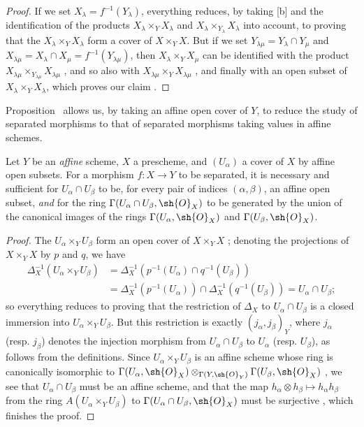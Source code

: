 \begin{proof}
If we set $X_\lambda=f^{-1}(Y_\lambda)$, everything reduces, by taking [b] and the identification of the products $X_\lambda\times_Y X_\lambda$ and $X_\lambda\times_{Y_\lambda}X_\lambda$  into account, to proving that the $X_\lambda\times_Y X_\lambda$ form a cover of $X\times_Y X$.
But if we set $Y_{\lambda\mu}=Y_\lambda\cap Y_\mu$ and $X_{\lambda\mu}=X_\lambda\cap X_\mu=f^{-1}(Y_{\lambda\mu})$, then $X_\lambda\times_Y X_\mu$ can be identified with the product $X_{\lambda\mu}\times_{Y_{\lambda\mu}}X_{\lambda\mu}$ , and so also with $X_{\lambda\mu}\times_Y X_{\lambda\mu}$ , and finally with an open subset of $X_\lambda\times_Y X_\lambda$, which proves our claim .
\end{proof}

Proposition~ allows us, by taking an affine open cover of $Y$, to reduce the study of separated morphisms to that of separated morphisms taking values in affine schemes.

\begin{proposition}[5.5.6]
\label{I.5.5.6}
Let $Y$ be an \emph{affine} scheme, $X$ a prescheme, and $(U_\alpha)$ a cover of $X$ by affine open subsets.
For a morphism $f:X\to Y$ to be separated, it is necessary and sufficient for $U_\alpha\cap U_\beta$ to be, for every pair of indices $(\alpha,\beta)$, an affine open subset, \emph{and} for the ring $\Gamma(U_\alpha\cap U_\beta,\sh{O}_X)$ to be generated by the union of the canonical images of the rings $\Gamma(U_\alpha,\sh{O}_X)$ and $\Gamma(U_\beta,\sh{O}_X)$.
\end{proposition}

\begin{proof}
The $U_\alpha\times_Y U_\beta$ form an open cover of $X\times_Y X$ ;
denoting the projections of $X\times_Y X$ by $p$ and $q$, we have
\begin{align*}
  \Delta_X^{-1}(U_\alpha\times_Y U_\beta)&=\Delta_X^{-1}(p^{-1}(U_\alpha)\cap q^{-1}(U_\beta))\\
                                         &=\Delta_X^{-1}(p^{-1}(U_\alpha))\cap\Delta_X^{-1}(q^{-1}(U_\beta))=U_\alpha\cap U_\beta;
\end{align*}
so everything reduces to proving that the restriction of $\Delta_X$ to $U_\alpha\cap U_\beta$ is a closed immersion into $U_\alpha\times_Y U_\beta$.
But this restriction is exactly $(j_\alpha,j_\beta)_Y$, where $j_\alpha$ (resp. $j_\beta$) denotes the injection morphism from $U_\alpha\cap U_\beta$ to $U_\alpha$ (resp. $U_\beta$), as follows from the definitions.
Since $U_\alpha\times_Y U_\beta$ is an affine scheme whose ring is canonically isomorphic to $\Gamma(U_\alpha,\sh{O}_X)\otimes_{\Gamma(Y,\sh{O}_Y)}\Gamma(U_\beta,\sh{O}_X)$ , we see that $U_\alpha\cap U_\beta$ must be an affine scheme, and that the map $h_\alpha\otimes h_\beta\mapsto h_\alpha h_\beta$ from the ring $A(U_\alpha\times_Y U_\beta)$ to $\Gamma(U_\alpha\cap U_\beta,\sh{O}_X)$ must be surjective , which finishes the proof.
\end{proof}


